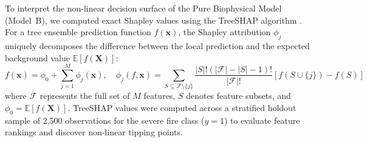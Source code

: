 To interpret the non-linear decision surface of the Pure Biophysical Model (Model~B), we computed exact Shapley values using the TreeSHAP algorithm \citep{LundbergLee2017NeurIPS}. For a tree ensemble prediction function $f(\mathbf{x})$, the Shapley attribution $\phi_j$ uniquely decomposes the difference between the local prediction and the expected background value $\mathbb{E}[f(\mathbf{X})]$:
\begin{equation}
f(\mathbf{x}) = \phi_0 + \sum_{j=1}^{M} \phi_j(\mathbf{x}), \quad \phi_j(f, \mathbf{x}) = \sum_{S \subseteq \mathcal{F} \setminus \{j\}} \frac{|S|!(|\mathcal{F}| - |S| - 1)!}{|\mathcal{F}|!} \left[ f(S \cup \{j\}) - f(S) \right]
\label{eq:shap}
\end{equation}
where $\mathcal{F}$ represents the full set of $M$ features, $S$ denotes feature subsets, and $\phi_0 = \mathbb{E}[f(\mathbf{X})]$. TreeSHAP values were computed across a stratified holdout sample of 2,500 observations for the severe fire class ($y=1$) to evaluate feature rankings and discover non-linear tipping points.
